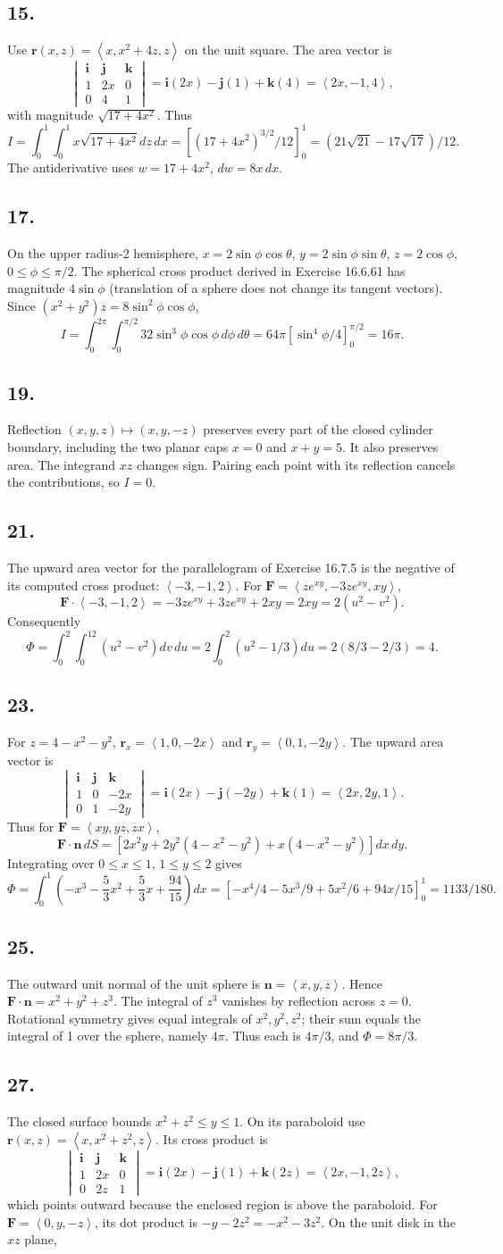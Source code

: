 \documentclass[11pt]{article}
\newcommand{\ex}[1]{\subsection*{#1.}}
\newcommand{\ans}[1]{\boxed{#1}}
\newcommand{\vv}[1]{\left\langle #1\right\rangle}
\newcommand{\ii}{\mathbf i}\newcommand{\jj}{\mathbf j}\newcommand{\kk}{\mathbf k}
\newcommand{\cp}[6]{\begin{vmatrix}\ii&\jj&\kk\\#1&#2&#3\\#4&#5&#6\end{vmatrix}}
\begin{document}
\ex{15}
Use $\mathbf r(x,z)=\vv{x,x^2+4z,z}$ on the unit square. The area vector is
\[\cp{1}{2x}{0}{0}{4}{1}=\ii(2x)-\jj(1)+\kk(4)=\vv{2x,-1,4},\]
with magnitude $\sqrt{17+4x^2}$. Thus
\[I=\int_0^1\int_0^1x\sqrt{17+4x^2}dz\,dx
=[(17+4x^2)^{3/2}/12]_0^1=\ans{(21\sqrt{21}-17\sqrt{17})/12}.\]
The antiderivative uses $w=17+4x^2$, $dw=8x\,dx$.
\ex{17}
On the upper radius-2 hemisphere, $x=2\sin\phi\cos\theta$, $y=2\sin\phi\sin\theta$, $z=2\cos\phi$, $0\le\phi\le\pi/2$. The spherical cross product derived in Exercise 16.6.61 has magnitude $4\sin\phi$ (translation of a sphere does not change its tangent vectors). Since $(x^2+y^2)z=8\sin^2\phi\cos\phi$,
\[I=\int_0^{2\pi}\int_0^{\pi/2}32\sin^3\phi\cos\phi\,d\phi\,d\theta
=64\pi[\sin^4\phi/4]_0^{\pi/2}=\ans{16\pi}.\]
\ex{19}
Reflection $(x,y,z)\mapsto(x,y,-z)$ preserves every part of the closed cylinder boundary, including the two planar caps $x=0$ and $x+y=5$. It also preserves area. The integrand $xz$ changes sign. Pairing each point with its reflection cancels the contributions, so $\ans{I=0}$.
\ex{21}
The upward area vector for the parallelogram of Exercise 16.7.5 is the negative of its computed cross product: $\vv{-3,-1,2}$. For $\mathbf F=\vv{ze^{xy},-3ze^{xy},xy}$,
\[\mathbf F\cdot\vv{-3,-1,2}=-3ze^{xy}+3ze^{xy}+2xy=2xy=2(u^2-v^2).\]
Consequently
\[\Phi=\int_0^2\int_0^12(u^2-v^2)dv\,du
=2\int_0^2(u^2-1/3)du=2(8/3-2/3)=\ans{4}.\]
\ex{23}
For $z=4-x^2-y^2$, $\mathbf r_x=\vv{1,0,-2x}$ and $\mathbf r_y=\vv{0,1,-2y}$. The upward area vector is
\[\cp{1}{0}{-2x}{0}{1}{-2y}=\ii(2x)-\jj(-2y)+\kk(1)=\vv{2x,2y,1}.\]
Thus for $\mathbf F=\vv{xy,yz,zx}$,
\[\mathbf F\cdot\mathbf n\,dS=[2x^2y+2y^2(4-x^2-y^2)+x(4-x^2-y^2)]dx\,dy.\]
Integrating over $0\le x\le1$, $1\le y\le2$ gives
\[\Phi=\int_0^1\left(-x^3-\frac53x^2+\frac53x+\frac{94}{15}\right)dx
=\left[-x^4/4-5x^3/9+5x^2/6+94x/15\right]_0^1
=\ans{1133/180}.\]
\ex{25}
The outward unit normal of the unit sphere is $\mathbf n=\vv{x,y,z}$. Hence $\mathbf F\cdot\mathbf n=x^2+y^2+z^3$. The integral of $z^3$ vanishes by reflection across $z=0$. Rotational symmetry gives equal integrals of $x^2,y^2,z^2$; their sum equals the integral of 1 over the sphere, namely $4\pi$. Thus each is $4\pi/3$, and $\ans{\Phi=8\pi/3}$.
\ex{27}
The closed surface bounds $x^2+z^2\le y\le1$. On its paraboloid use $\mathbf r(x,z)=\vv{x,x^2+z^2,z}$. Its cross product is
\[\cp{1}{2x}{0}{0}{2z}{1}=\ii(2x)-\jj(1)+\kk(2z)=\vv{2x,-1,2z},\]
which points outward because the enclosed region is above the paraboloid. For $\mathbf F=\vv{0,y,-z}$, its dot product is $-y-2z^2=-x^2-3z^2$. On the unit disk in the $xz$ plane,
\end{document}
